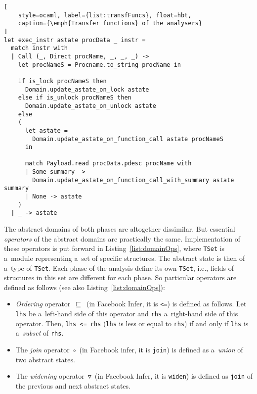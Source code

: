 \begin{lstlisting}[
    style=ocaml, label={list:transfFuncs}, float=hbt,
    caption={\emph{Transfer functions} of the analysers}
]
let exec_instr astate procData _ instr =
  match instr with
  | Call (_, Direct procName, _, _, _) ->
    let procNameS = Procname.to_string procName in

    if is_lock procNameS then
      Domain.update_astate_on_lock astate
    else if is_unlock procNameS then
      Domain.update_astate_on_unlock astate
    else
    (
      let astate =
        Domain.update_astate_on_function_call astate procNameS
      in

      match Payload.read procData.pdesc procName with
      | Some summary ->
        Domain.update_astate_on_function_call_with_summary astate summary
      | None -> astate
    )
  | _ -> astate
\end{lstlisting}

The abstract domains of both phases are altogether dissimilar. But
essential \emph{operators} of the abstract domains are practically the
same. Implementation of these operators is put forward in
Listing~\ref{list:domainOps}, where \texttt{TSet} is a~module
representing a~set of specific structures. The abstract state is then
of a~type of \texttt{TSet}. Each phase of the analysis define its
own \texttt{TSet}, i.e., fields of structures in this set are different
for each phase. So particular operators are defined as follows
(see also Listing~\ref{list:domainOps}):
\begin{itemize}
    \item
        \emph{Ordering} operator~$ \sqsubseteq $~(in Facebook Infer,
        it is \texttt{<=}) is defined as follows. Let \texttt{lhs} be
        a~left-hand side of this operator and \texttt{rhs} a~right-hand
        side of this operator. Then, \texttt{lhs~<=~rhs} (\texttt{lhs} is
        less or equal to \texttt{rhs}) if and only if
        \texttt{lhs} is a~\emph{subset} of \texttt{rhs}.

    \item
        The \emph{join} operator~$ \circ $~(in Facebook infer, it is
        \texttt{join}) is defined as a~\emph{union} of two abstract states.

    \item
        The \emph{widening} operator~$ \triangledown $~(in Facebook Infer,
        it is \texttt{widen}) is defined as \texttt{join} of the previous
        and next abstract states.
\end{itemize}

